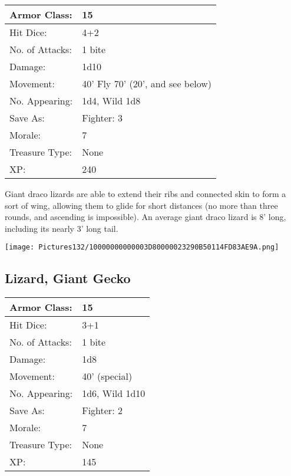 \documentclass[a4paper,twoside,openany,10pt]{book}
\begin{document}
\begin{multicols}{2}
\begin{tabularx}{0.50\textwidth}{@{}lX@{}}
Armor Class: & 15 \\\hline
Hit Dice: & 4+2 \\\hline
No. of Attacks: & 1 bite \\\hline
Damage: & 1d10 \\\hline
Movement: & 40' Fly 70'
(20', and see below) \\\hline
No. Appearing: & 1d4, Wild 1d8 \\\hline
Save As: & Fighter: 3 \\\hline
Morale: & 7 \\\hline
Treasure Type: & None \\\hline
XP: & 240 \\\hline
\end{tabularx}\medskip

Giant draco lizards are able to extend their ribs and connected skin to
form a sort of wing, allowing them to glide for short distances (no more
than three rounds, and ascending is impossible). An average giant draco
lizard is 8' long, including its nearly
3' long tail.

\begin{center} \texttt{[image: Pictures132/10000000000003D80000023290B50114FD83AE9A.png]} \end{center}


\subsection*{Lizard, Giant Gecko}\label{lizard-giant-gecko}

\begin{tabularx}{0.50\textwidth}{@{}lX@{}}
Armor Class: & 15 \\\hline
Hit Dice: & 3+1 \\\hline
No. of Attacks: & 1 bite \\\hline
Damage: & 1d8 \\\hline
Movement: & 40' (special) \\\hline
No. Appearing: & 1d6, Wild 1d10 \\\hline
Save As: & Fighter: 2 \\\hline
Morale: & 7 \\\hline
Treasure Type: & None \\\hline
XP: & 145 \\\hline
\end{tabularx}\medskip


\end{multicols}
\end{document}
